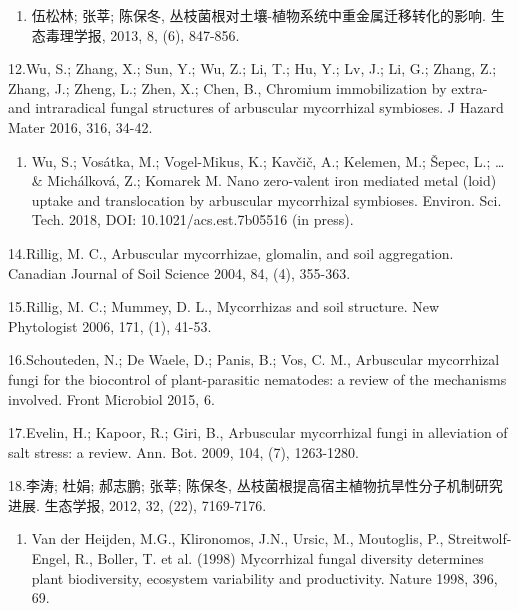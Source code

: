 \documentclass[]{book}
\providecommand{\tightlist}{%
  \setlength{\itemsep}{0pt}\setlength{\parskip}{0pt}}
\begin{document}
\begin{enumerate}
\def\labelenumi{\arabic{enumi}.}
\setcounter{enumi}{10}
\tightlist
\item
  伍松林; 张莘; 陈保冬, 丛枝菌根对土壤-植物系统中重金属迁移转化的影响. 生态毒理学报, 2013, 8, (6), 847-856.
\end{enumerate}

12.Wu, S.; Zhang, X.; Sun, Y.; Wu, Z.; Li, T.; Hu, Y.; Lv, J.; Li, G.; Zhang, Z.; Zhang, J.; Zheng, L.; Zhen, X.; Chen, B., Chromium immobilization by extra- and intraradical fungal structures of arbuscular mycorrhizal symbioses. J Hazard Mater 2016, 316, 34-42.

\begin{enumerate}
\def\labelenumi{\arabic{enumi}.}
\setcounter{enumi}{12}
\tightlist
\item
  Wu, S.; Vosátka, M.; Vogel-Mikus, K.; Kavčič, A.; Kelemen, M.; Šepec, L.; \ldots{} \& Michálková, Z.; Komarek M. Nano zero-valent iron mediated metal (loid) uptake and translocation by arbuscular mycorrhizal symbioses. Environ. Sci. Tech. 2018, DOI: 10.1021/acs.est.7b05516 (in press).
\end{enumerate}

14.Rillig, M. C., Arbuscular mycorrhizae, glomalin, and soil aggregation. Canadian Journal of Soil Science 2004, 84, (4), 355-363.

15.Rillig, M. C.; Mummey, D. L., Mycorrhizas and soil structure. New Phytologist 2006, 171, (1), 41-53.

16.Schouteden, N.; De Waele, D.; Panis, B.; Vos, C. M., Arbuscular mycorrhizal fungi for the biocontrol of plant-parasitic nematodes: a review of the mechanisms involved. Front Microbiol 2015, 6.

17.Evelin, H.; Kapoor, R.; Giri, B., Arbuscular mycorrhizal fungi in alleviation of salt stress: a review. Ann. Bot. 2009, 104, (7), 1263-1280.

18.李涛; 杜娟; 郝志鹏; 张莘; 陈保冬, 丛枝菌根提高宿主植物抗旱性分子机制研究进展. 生态学报, 2012, 32, (22), 7169-7176.

\begin{enumerate}
\def\labelenumi{\arabic{enumi}.}
\setcounter{enumi}{18}
\tightlist
\item
  Van der Heijden, M.G., Klironomos, J.N., Ursic, M., Moutoglis, P., Streitwolf-Engel, R., Boller, T. et al. (1998) Mycorrhizal fungal diversity determines plant biodiversity, ecosystem variability and productivity. Nature 1998, 396, 69.
\end{enumerate}
\end{document}
